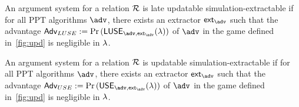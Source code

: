 \begin{definition}\label{late-use}
	An argument system for a relation $\mathcal{R}$ is late updatable simulation-extractable if for all PPT algorithms $\adv$, there exists an extractor $\ext_{\adv}$ such that the advantage $\Adv_{LUSE}:=\Pr \left( \mathsf{LUSE}_{\adv,\ext_{\adv}}(\secp)\right)$ of $\adv$ in the game defined in~\cref{fig:upd} is negligible in $\lambda$.
\end{definition}

\begin{definition}\label{USE}
	An argument system for a relation $\mathcal{R}$ is updatable simulation-extractable if for all PPT algorithms $\adv$, there exists an extractor $\ext_{\adv}$ such that the advantage $\Adv_{USE} := \Pr \left( \mathsf{USE}_{\adv,\ext_{\adv}}(\secp)\right)$ of $\adv$ in the game defined in~\cref{fig:upd} is negligible in $\lambda$.
\end{definition}

